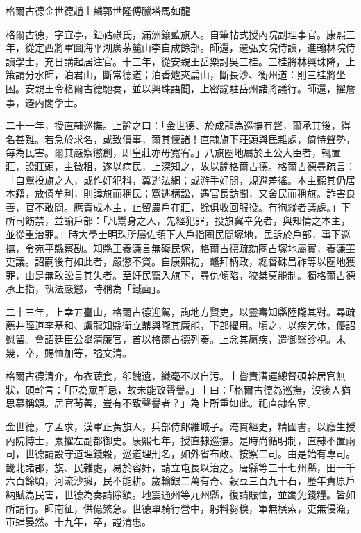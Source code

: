 
\begin{pinyinscope}
格爾古德金世德趙士麟郭世隆傅臘塔馬如龍

格爾古德，字宜亭，鈕祜祿氏，滿洲鑲藍旗人。自筆帖式授內院副理事官。康熙三年，從定西將軍圖海平湖廣茅麓山李自成餘部。師還，遷弘文院侍讀，進翰林院侍讀學士，充日講起居注官。十三年，從安親王岳樂討吳三桂。三桂將林興珠降，上策請分水師，泊君山，斷常德道；泊香爐夾扁山，斷長沙、衡州道：則三桂將坐困。安親王令格爾古德馳奏，並以興珠語聞，上密諭駐岳州諸將議行。師還，擢詹事，遷內閣學士。

二十一年，授直隸巡撫。上諭之曰：「金世德、於成龍為巡撫有聲，爾承其後，得名甚難。若急於求名，或致僨事，爾其懍諸！直隸旗下莊頭與民雜處，倚恃聲勢，每為民害。爾其嚴察懲創，即皇莊亦毋寬宥。」八旗圈地屬於王公大臣者，輒置莊，設莊頭，主徵租，遂以病民，上深知之，故以諭格爾古德。格爾古德尋疏言：「自鬻投旗之人，或作奸犯科，冀逃法網；或游手好閒，規避差徭。本主聽其仍居本籍，放債牟利，則諱旗而稱民；窩逃構訟，遇官長訪聞，又舍民而稱旗。詐害良善，官不敢問。應責成本主，止留農戶在莊，餘俱收回服役。有徇縱者議處。」下所司飭禁，並諭戶部：「凡鬻身之人，先經犯罪，投旗冀幸免者，與知情之本主，並從重治罪。」時大學士明珠所屬佐領下人戶指圈民間塚地，民訴於戶部，事下巡撫，令宛平縣察勘。知縣王養濂言無礙民塚，格爾古德疏劾圈占塚地屬實，養濂罣吏議。詔嗣後有如此者，嚴懲不貸。自康熙初，鼇拜柄政，總督硃昌祚等以圈地獲罪，由是無敢訟言其失者。至奸民竄入旗下，尋仇傾陷，狡桀莫能制。獨格爾古德承上指，執法嚴懲，時稱為「鐵面」。

二十三年，上幸五臺山，格爾古德迎駕，詢地方賢吏，以靈壽知縣陸隴其對。尋疏薦井陘道李基和、盧龍知縣衛立鼎與隴其廉能，下部擢用。頃之，以疾乞休，優詔慰留。會詔廷臣公舉清廉官，首以格爾古德列奏。上念其羸疾，遣御醫診視。未幾，卒，賜恤加等，謚文清。

格爾古德清介，布衣蔬食，卻餽遺，纖毫不以自污。上嘗責漕運總督碩幹居官無狀，碩幹言：「臣為眾所忌，故未能致聲譽。」上曰：「格爾古德為巡撫，沒後人猶思慕稱頌。居官茍善，豈有不致聲譽者？」為上所重如此。祀直隸名宦。

金世德，字孟求，漢軍正黃旗人，兵部侍郎維城子。淹貫經史，精國書。以廕生授內院博士，累擢左副都御史。康熙七年，授直隸巡撫。是時尚循明制，直隸不置兩司，世德請設守道理錢穀，巡道理刑名，如外省布政、按察二司。由是始有專司。畿北諸郡，旗、民雜處，易於容奸，請立屯長以治之。唐縣等三十七州縣，田一千六百餘頃，河流沙擁，民不能耕。歲輸銀二萬有奇、穀豆三百九十石，歷年責原戶納賦為民害，世德為奏請除額。地震通州等九州縣，復請賑恤，並蠲免錢糧。皆如所請行。師南征，供億繁急。世德單騎行營中，躬料芻糗，軍無橫索，吏無侵漁，市肆晏然。十九年，卒，謚清惠。


\end{pinyinscope}
